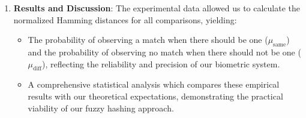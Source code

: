 \begin{enumerate}
    \item \textbf{Results and Discussion}: The experimental data allowed us to calculate the normalized Hamming distances for all comparisons, yielding:
    \begin{itemize}
        \item The probability of observing a match when there should be one (\(\mu_{\text{same}}\)) and the probability of observing no match when there should not be one (\(\mu_{\text{diff}}\)), reflecting the reliability and precision of our biometric system.
        
        \item A comprehensive statistical analysis which compares these empirical results with our theoretical expectations, demonstrating the practical viability of our fuzzy hashing approach.
    \end{itemize}
\end{enumerate}